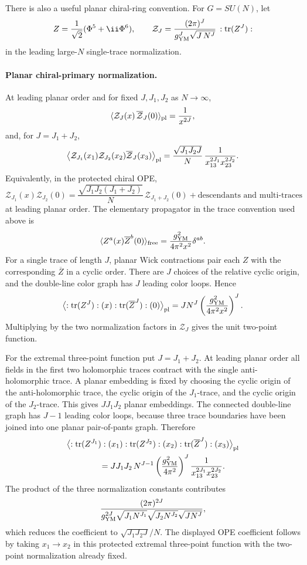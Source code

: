 There is also a useful planar chiral-ring convention.  For \(G=SU(N)\), let
\[
  Z=\frac{1}{\sqrt2}(\Phi^5+\ii\Phi^6),
  \qquad
  \mathcal Z_J
  =
  \frac{(2\pi)^J}{g_{\rm YM}^J\sqrt{J\,N^J}}\,
  :\operatorname{tr}(Z^J):
\]
in the leading large-\(N\) single-trace normalization.

\paragraph{Planar chiral-primary normalization.}
At leading planar order and for fixed \(J,J_1,J_2\) as \(N\to\infty\),
\[
  \langle \mathcal Z_J(x)\,\overline{\mathcal Z}_J(0)\rangle_{\rm pl}
  =
  \frac{1}{x^{2J}},
\]
and, for \(J=J_1+J_2\),
\[
  \bigl\langle
  \mathcal Z_{J_1}(x_1)\mathcal Z_{J_2}(x_2)
  \overline{\mathcal Z}_{J}(x_3)
  \bigr\rangle_{\rm pl}
  =
  \frac{\sqrt{J_1J_2J}}{N}\,
  \frac{1}{x_{13}^{2J_1}x_{23}^{2J_2}} .
\]
Equivalently, in the protected chiral OPE,
\[
  \mathcal Z_{J_1}(x)\mathcal Z_{J_2}(0)
  =
  \frac{\sqrt{J_1J_2(J_1+J_2)}}{N}\,
  \mathcal Z_{J_1+J_2}(0)
  +\text{descendants and multi-traces}
\]
at leading planar order.
The elementary propagator in the trace convention used above is
\[
  \langle Z^a(x)\overline Z^b(0)\rangle_{\rm free}
  =
  \frac{g_{\rm YM}^2}{4\pi^2x^2}\delta^{ab}.
\]
For a single trace of length \(J\), planar Wick contractions pair each \(Z\)
with the corresponding \(\overline Z\) in a cyclic order.  There are \(J\)
choices of the relative cyclic origin, and the double-line color graph has
\(J\) leading color loops.  Hence
\[
  \bigl\langle :\operatorname{tr}(Z^J):(x)
  :\operatorname{tr}(\overline Z^J):(0)\bigr\rangle_{\rm pl}
  =
  JN^J
  \left(\frac{g_{\rm YM}^2}{4\pi^2x^2}\right)^J .
\]
Multiplying by the two normalization factors in \(\mathcal Z_J\) gives the
unit two-point function.

For the extremal three-point function put \(J=J_1+J_2\).  At leading planar
order all fields in the first two holomorphic traces contract with the single
anti-holomorphic trace.  A planar embedding is fixed by choosing the cyclic
origin of the anti-holomorphic trace, the cyclic origin of the
\(J_1\)-trace, and the cyclic origin of the \(J_2\)-trace.  This gives
\(JJ_1J_2\) planar embeddings.  The connected double-line graph has
\(J-1\) leading color loops, because three trace boundaries have been joined
into one planar pair-of-pants graph.  Therefore
\[
\begin{aligned}
  &\bigl\langle
  :\operatorname{tr}(Z^{J_1}):(x_1)
  :\operatorname{tr}(Z^{J_2}):(x_2)
  :\operatorname{tr}(\overline Z^J):(x_3)
  \bigr\rangle_{\rm pl}
\\
  &\hspace{4em}
  =
  JJ_1J_2\,N^{J-1}
  \left(\frac{g_{\rm YM}^2}{4\pi^2}\right)^J
  \frac{1}{x_{13}^{2J_1}x_{23}^{2J_2}} .
\end{aligned}
\]
The product of the three normalization constants contributes
\[
  \frac{(2\pi)^{2J}}
       {g_{\rm YM}^{2J}\sqrt{J_1N^{J_1}}\sqrt{J_2N^{J_2}}\sqrt{JN^J}},
\]
which reduces the coefficient to \(\sqrt{J_1J_2J}/N\).  The displayed OPE
coefficient follows by taking \(x_1\to x_2\) in this protected extremal
three-point function with the two-point normalization already fixed.

